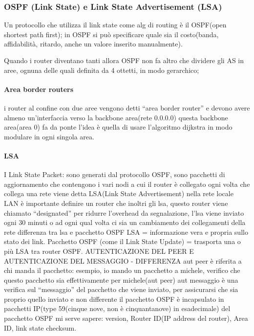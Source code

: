 \subsubsection{OSPF (Link State) e Link State Advertisement (LSA)}

Un protocollo che utilizza il link state come alg di routing è il OSPF(open shortest path first);
in OSPF si può specificare quale sia il costo(banda, affidabilità, ritardo, anche un valore inserito manualmente).

Quando i router diventano tanti allora OSPF non fa altro che dividere gli AS in aree, ognuna delle quali definita da 4 ottetti, in modo gerarchico;
\paragraph{Area border routers}
i router al confine con due aree vengono detti “area border router” e devono avere almeno un'interfaccia verso la backbone area(rete 0.0.0.0)
questa backbone area(area 0) fa da ponte
l'idea è quella di usare l'algoritmo dijkstra in modo modulare in ogni singola area.

\paragraph{LSA}
I Link State Packet: sono generati dal protocollo OSPF, sono pacchetti di aggiornamento che contengono i vari nodi a cui il router è collegato
ogni volta che collega una rete viene detta LSA(Link State Advertisement)
nella rete locale LAN è importante definire un router che inoltri gli lsa, questo router viene chiamato “designated”
per ridurre l'overhead da segnalazione, l'lsa viene inviato ogni 30 minuti o ad ogni qual volta ci sia un cambiamento dei collegamenti della rete
differenza tra lsa e pacchetto OSPF
LSA = informazione vera e propria sullo stato dei link.
Pacchetto OSPF (come il Link State Update) = trasporta una o più LSA tra router OSPF.
AUTENTICAZIONE DEL PEER E AUTENTICAZIONE DEL MESSAGGIO - DIFFERENZA
aut peer è riferita a chi manda il pacchetto: esempio, io mando un pacchetto a michele, verifico che questo pacchetto sia effettivamente per michele(aut peer)
aut messaggio è una verifica sul “messaggio” del pacchetto che viene inviato, per assicurarsi che sia proprio quello inviato e non differente
il pacchetto OSPF è incapsulato in pacchetti IP(type 59(cinque nove, non è cinquantanove) in esadecimale)
del pacchetto OSPF mi serve sapere: version, Router ID(IP address del router), Area ID, link state checksum.


